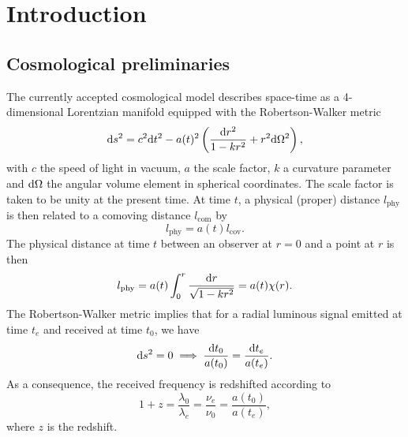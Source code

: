 \chapter{Introduction}\label{chapter:intro}


\section{Cosmological preliminaries}
The currently accepted cosmological model describes space-time as a 4-dimensional Lorentzian manifold equipped with the Robertson-Walker metric \cite{carroll}
\begin{equation}\label{eq_ch1:RW_metric}
    \differential s^2=c^2\differential t^2-a(t)^2\left( \frac{\differential r^2}{1-kr^2}+r^2 \differential \Omega^2 \right),
\end{equation}
with $c$ the speed of light in vacuum, $a$ the scale factor, $k$ a curvature parameter and  $\differential \Omega$ the angular volume element in spherical coordinates. The scale factor is taken to be unity at the present time. At time $t$, a physical (proper) distance $l_\text{phy}$ is then related to a comoving distance $l_\text{com}$ by 
\begin{equation}\label{eq_ch1:phy_com_dis}
    l_\text{phy}=a(t)l_\text{cov}.
\end{equation}
The physical distance at time $t$ between an observer at $r=0$ and a point at $r$ is then
\begin{equation}\label{eq_ch1:def_com_len}
    l_\text{phy}=a(t)\int_0^r \frac{\differential r}{\sqrt{1-kr^2}}=a(t)\chi(r).
\end{equation}
The Robertson-Walker metric implies that for a radial luminous signal emitted at time $t_e$ and received at time $t_0$, we have
\begin{equation}
    \differential s^2=0 \implies \frac{\differential t_0}{a(t_0)}=\frac{\differential t_e}{a(t_e)}.
\end{equation}
As a consequence, the received frequency is redshifted according to
\begin{equation}
    1+z=\frac{\lambda_0}{\lambda_e}=\frac{\nu_e}{\nu_0}=\frac{a(t_0)}{a(t_e)},
\end{equation}
where $z$ is the redshift.

